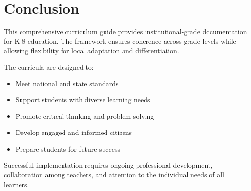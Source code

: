\documentclass[11pt,letterpaper]{report}
\begin{document}
\clearpage

\chapter*{Conclusion}

This comprehensive curriculum guide provides institutional-grade documentation for K-8 education. The framework ensures coherence across grade levels while allowing flexibility for local adaptation and differentiation.

The curricula are designed to:

\begin{itemize}
    \item Meet national and state standards
    \item Support students with diverse learning needs
    \item Promote critical thinking and problem-solving
    \item Develop engaged and informed citizens
    \item Prepare students for future success
\end{itemize}

Successful implementation requires ongoing professional development, collaboration among teachers, and attention to the individual needs of all learners.
\end{document}
